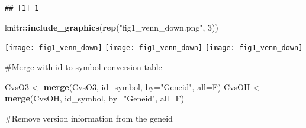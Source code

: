 \documentclass[]{article}
\newenvironment{Shaded}{\begin{snugshade}}{\end{snugshade}}
\newcommand{\CharTok}[1]{\textcolor[rgb]{0.31,0.60,0.02}{#1}}
\newcommand{\DataTypeTok}[1]{\textcolor[rgb]{0.13,0.29,0.53}{#1}}
\newcommand{\DecValTok}[1]{\textcolor[rgb]{0.00,0.00,0.81}{#1}}
\newcommand{\KeywordTok}[1]{\textcolor[rgb]{0.13,0.29,0.53}{\textbf{#1}}}
\newcommand{\NormalTok}[1]{#1}
\newcommand{\OperatorTok}[1]{\textcolor[rgb]{0.81,0.36,0.00}{\textbf{#1}}}
\newcommand{\StringTok}[1]{\textcolor[rgb]{0.31,0.60,0.02}{#1}}
\begin{document}
\begin{Shaded}
\end{Shaded}

\begin{verbatim}
## [1] 1
\end{verbatim}

\begin{Shaded}
\begin{Highlighting}[]
\NormalTok{knitr}\OperatorTok{::}\KeywordTok{include_graphics}\NormalTok{(}\KeywordTok{rep}\NormalTok{(}\StringTok{"fig1_venn_down.png"}\NormalTok{, }\DecValTok{3}\NormalTok{))}
\end{Highlighting}
\end{Shaded}

\texttt{[image: fig1\_venn\_down]}
\texttt{[image: fig1\_venn\_down]}
\texttt{[image: fig1\_venn\_down]}

\#Merge with id to symbol conversion table

\begin{Shaded}
\begin{Highlighting}[]
\NormalTok{CvsO3 <-}\StringTok{ }\KeywordTok{merge}\NormalTok{(CvsO3, id_symbol, }\DataTypeTok{by=}\StringTok{"Geneid"}\NormalTok{, }\DataTypeTok{all=}\NormalTok{F)}
\NormalTok{CvsOH <-}\StringTok{ }\KeywordTok{merge}\NormalTok{(CvsOH, id_symbol, }\DataTypeTok{by=}\StringTok{"Geneid"}\NormalTok{, }\DataTypeTok{all=}\NormalTok{F)}
\end{Highlighting}
\end{Shaded}

\#Remove version information from the geneid

\begin{Shaded}
\end{Shaded}
\end{document}
